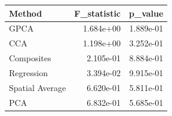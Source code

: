 \begin{tabular}{lrr}
\toprule
Method & F_statistic & p_value \\
\midrule
GPCA & 1.684e+00 & 1.889e-01 \\
CCA & 1.198e+00 & 3.252e-01 \\
Composites & 2.105e-01 & 8.884e-01 \\
Regression & 3.394e-02 & 9.915e-01 \\
Spatial Average & 6.620e-01 & 5.811e-01 \\
PCA & 6.832e-01 & 5.685e-01 \\
\bottomrule
\end{tabular}
